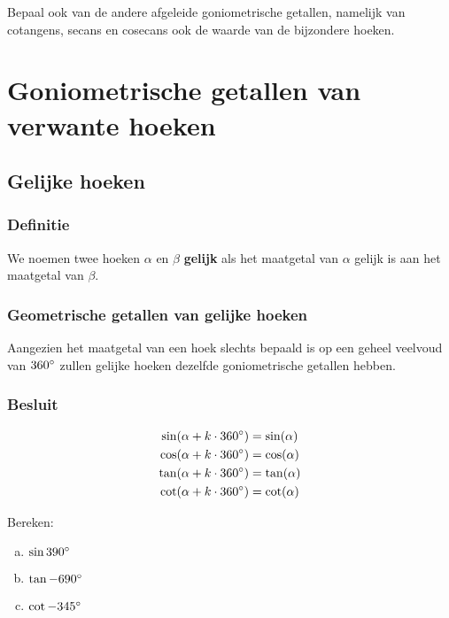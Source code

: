 \documentclass[a4paper,12pt]{article}
\begin{document}
\begin{oefening}
Bepaal ook van de andere afgeleide goniometrische getallen, namelijk van cotangens, secans en cosecans ook de waarde van de bijzondere hoeken.
\end{oefening}


\pagebreak
\section{Goniometrische getallen van verwante hoeken}

\begin{theorie}

\subsection{Gelijke hoeken}

\subsubsection*{Definitie}
We noemen twee hoeken $\alpha$ en $\beta$ \textbf{gelijk} als het maatgetal van $\alpha$ gelijk is aan het maatgetal van $\beta$.

\subsubsection*{Geometrische getallen van gelijke hoeken}
Aangezien het maatgetal van een hoek slechts bepaald is op een geheel veelvoud van $360^\circ$ zullen gelijke hoeken dezelfde goniometrische getallen hebben.

\subsubsection*{Besluit}
\begin{align*}
\sin(\alpha+k\cdot 360^\circ)&=\sin(\alpha)\\
\cos(\alpha+k\cdot 360^\circ)&=\cos(\alpha)\\
\tan(\alpha+k\cdot 360^\circ)&=\tan(\alpha)\\
\cot(\alpha+k\cdot 360^\circ)&=\cot(\alpha)\\
\end{align*}

\end{theorie}

\begin{oefening}
Bereken:
\begin{enumerate}[(a)]
  \item $\sin 390^\circ$
  \item $\tan -690^\circ$
  \item $\cot -345^\circ$
\end{enumerate}
\end{oefening}
\end{document}
